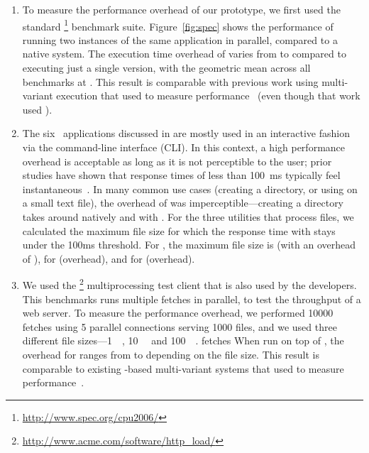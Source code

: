 \begin{enumerate}
\item[\speczerosix] To measure the performance overhead of our prototype, we
  first used the standard
  \speczerosix\footnote{\url{http://www.spec.org/cpu2006/}} benchmark suite.
  Figure~\ref{fig:spec} shows the performance of \mx running two instances of
  the same application in parallel, compared to a native system. The execution
  time overhead of \mx varies from \minOverSPEC to \maxOverSPEC compared to
  executing just a single version, with the geometric mean across all
  \numSPECbench benchmarks at \avgOverSPEC. This result is comparable with
  previous work using multi-variant execution that used \speccpu to measure
  performance~\cite{orchestra09} (even though that work used \speczerozero).


\item[\gnu~\coreutils] The six \gnu~\coreutils applications discussed in
   are mostly used in an interactive fashion via the
  command-line interface (CLI). In this context, a high performance
  overhead is acceptable as long as it is not perceptible to the user; prior
  studies have shown that response times of less than \SI{100}{\milli\second}
  typically feel instantaneous~\cite{card:human_proc}. In many common use cases
  (\eg creating a directory, or using \cut on a small text file), the overhead
  of \mx was imperceptible---creating a directory takes around \avgMkdirNative
  natively and \avgMkdirMx with \mx. For the three utilities that process
  files, we calculated the maximum file size for which the response time with
  \mx stays under the 100ms threshold.  For \cut, the maximum file size is
  \cutCutoffSize (with an overhead of \cutCutoffOver), for \mdsum
  \mdsumCutoffSize (\mdsumCutoffOver overhead), and for \shasum
  \shasumCutoffSize (\shasumCutoffOver overhead).

\item[\lighttpd] We used the
  \httpload\footnote{\url{http://www.acme.com/software/http_load/}}
  multiprocessing test client that is also used by the \lighttpd developers.
  This benchmarks runs multiple fetches in parallel, to test the throughput of
  a web server. To measure the performance overhead, we performed \num{10000}
  fetches using \num{5} parallel connections serving \num{1000} files, and we
  used three different file sizes---\SI{1}{\kilo\byte}, \SI{10}{\kilo\byte}
  and \SI{100}{\kilo\byte}.  fetches  When run on top of \mx, the overhead for
  \lighttpd ranges from \minLighttpdOver to \maxLighttpdOver depending on the
  file size. This result is comparable to existing \ptrace-based multi-variant
  systems that used \lighttpd to measure performance~\cite{tachyon12}.


\end{enumerate}
